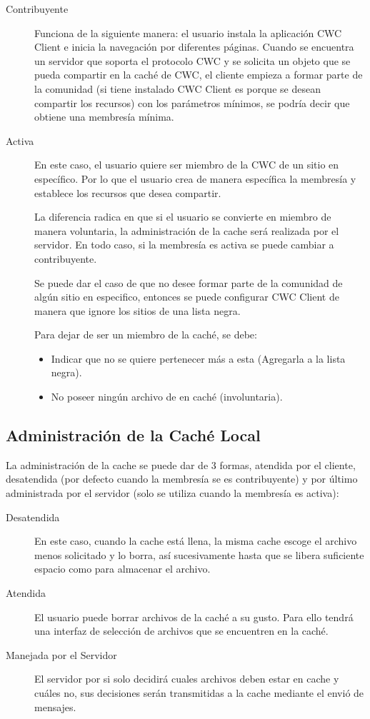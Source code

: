 \begin{description}
\item[Contribuyente] Funciona de la siguiente manera: el usuario instala la aplicación CWC Client e inicia la navegación por diferentes páginas. Cuando se encuentra un servidor que soporta el protocolo CWC y se solicita un objeto que se pueda compartir en la caché de CWC, el cliente empieza a formar parte de la comunidad (si tiene instalado CWC Client es porque se desean compartir los recursos) con los parámetros mínimos, se podría decir que obtiene una membresía mínima.

\item[Activa] En este caso, el usuario quiere ser miembro de la CWC de un sitio en específico. Por lo que el usuario crea de manera específica la membresía y establece los recursos que desea compartir.

La diferencia radica en que si el usuario se convierte en miembro de manera voluntaria, la administración de la cache será realizada por el servidor. En todo caso, si la membresía es activa se puede cambiar a contribuyente.

Se puede dar el caso de que no desee formar parte de la comunidad de algún sitio en especifico, entonces se puede configurar CWC Client de manera que ignore los sitios de una lista negra.

Para dejar de ser un miembro de la caché, se debe:

\begin{itemize}
\item Indicar que no se quiere pertenecer más a esta (Agregarla a la lista negra).
\item No poseer ningún archivo de en caché (involuntaria).
\end{itemize}

\end{description}


\subsection{Administración de la Caché Local}

La administración de la cache se puede dar de 3 formas, atendida por el cliente, desatendida (por defecto cuando la membresía se es contribuyente) y por último administrada por el servidor (solo se utiliza cuando la membresía es activa):

\begin{description}
\item[Desatendida] En este caso, cuando la cache está llena, la misma cache escoge el archivo menos solicitado y lo borra, así sucesivamente hasta que se libera suficiente espacio como para almacenar el archivo. 
\item[Atendida] El usuario puede borrar archivos de la caché a su gusto. Para ello tendrá una interfaz de selección de archivos que se encuentren en la caché.
\item[Manejada por el Servidor] El servidor por si solo decidirá cuales archivos deben estar en cache y cuáles no, sus decisiones serán transmitidas a la cache mediante el envió de mensajes. 
\end{description}


